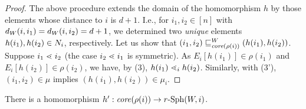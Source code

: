 \documentclass{LMCS}
\begin{document}
\begin{proof}
The above procedure extends the domain of the homomorphism $h$ by those
elements whose distance to $i$ is $d+1$. I.e., for $i_1,i_2 \in [n]$ with
$\dist_W(i,i_1)=\dist_W(i,i_2) = d+1$, we determined two \emph{unique}
elements $h(i_1),h(i_2) \in \Nat_i$, respectively. Let us show that
$\wsimulate{W}{\core(\rho(i))}{(i_1,i_2)}{(h(i_1),h(i_2)})$. Suppose $i_1
\succrel i_2$ (the case $i_2 \succrel i_1$ is symmetric). As $E_i[h(i_1)] \in
\rho(i_1)$ and $E_i[h(i_2)] \in \rho(i_2)$, we have, by (3), $h(i_1)
\succrel_i h(i_2)$. Similarly, with (3'), $(i_1,i_2) \in \mu$ implies
$(h(i_1),h(i_2)) \in \mu_i$.
\end{proof}


\begin{myclaim}\label{cl:back}
  There is a homomorphism $h': \core(\rho(i)) \rightarrow \Sph{\radius}{W}{i}$.
\end{myclaim}
\end{document}

